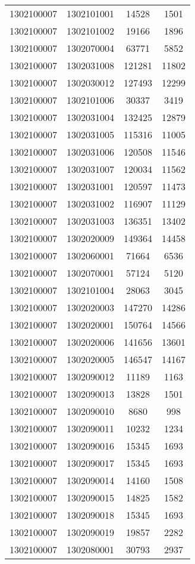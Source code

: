 \begin{longtable}[h]{llcc}
		1302100007 & 1302101001 & 14528 & 1501\\
		1302100007 & 1302101002 & 19166 & 1896\\
		1302100007 & 1302070004 & 63771 & 5852\\
		1302100007 & 1302031008 & 121281 & 11802\\
		1302100007 & 1302030012 & 127493 & 12299\\
		1302100007 & 1302101006 & 30337 & 3419\\
		1302100007 & 1302031004 & 132425 & 12879\\
		1302100007 & 1302031005 & 115316 & 11005\\
		1302100007 & 1302031006 & 120508 & 11546\\
		1302100007 & 1302031007 & 120034 & 11562\\
		1302100007 & 1302031001 & 120597 & 11473\\
		1302100007 & 1302031002 & 116907 & 11129\\
		1302100007 & 1302031003 & 136351 & 13402\\
		1302100007 & 1302020009 & 149364 & 14458\\
		1302100007 & 1302060001 & 71664 & 6536\\
		1302100007 & 1302070001 & 57124 & 5120\\
		1302100007 & 1302101004 & 28063 & 3045\\
		1302100007 & 1302020003 & 147270 & 14286\\
		1302100007 & 1302020001 & 150764 & 14566\\
		1302100007 & 1302020006 & 141656 & 13601\\
		1302100007 & 1302020005 & 146547 & 14167\\
		1302100007 & 1302090012 & 11189 & 1163\\
		1302100007 & 1302090013 & 13828 & 1501\\
		1302100007 & 1302090010 & 8680 & 998\\
		1302100007 & 1302090011 & 10232 & 1234\\
		1302100007 & 1302090016 & 15345 & 1693\\
		1302100007 & 1302090017 & 15345 & 1693\\
		1302100007 & 1302090014 & 14160 & 1508\\
		1302100007 & 1302090015 & 14825 & 1582\\
		1302100007 & 1302090018 & 15345 & 1693\\
		1302100007 & 1302090019 & 19857 & 2282\\
		1302100007 & 1302080001 & 30793 & 2937\\

\end{longtable}

